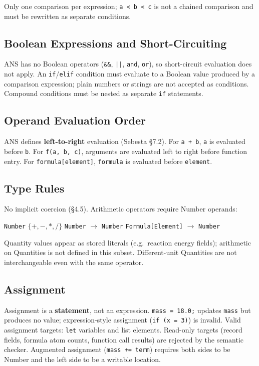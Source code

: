\documentclass[11pt,a4paper]{article}
\newcommand{\code}[1]{\texttt{#1}}
\begin{document}
Only one comparison per expression; \code{a < b < c} is not a chained comparison and must be rewritten as separate conditions.

\subsection{Boolean Expressions and Short-Circuiting}
ANS has no Boolean operators (\code{\&\&}, \code{||}, \code{and}, \code{or}), so short-circuit evaluation does not apply. An \code{if}/\code{elif} condition must evaluate to a Boolean value produced by a comparison expression; plain numbers or strings are not accepted as conditions. Compound conditions must be nested as separate \code{if} statements.

\subsection{Operand Evaluation Order}
ANS defines \textbf{left-to-right} evaluation (Sebesta \S7.2). For \code{a + b}, \code{a} is evaluated before \code{b}. For \code{f(a, b, c)}, arguments are evaluated left to right before function entry. For \code{formula[element]}, \code{formula} is evaluated before \code{element}.

\subsection{Type Rules}
No implicit coercion (\S4.5). Arithmetic operators require Number operands:
\begin{center}
\code{Number} $\{+, -, *, /\}$ \code{Number} $\to$ \code{Number} \qquad
\code{Formula[Element]} $\to$ \code{Number}
\end{center}
Quantity values appear as stored literals (e.g.\ reaction energy fields); arithmetic on Quantities is not defined in this subset. Different-unit Quantities are not interchangeable even with the same operator.

\subsection{Assignment}
Assignment is a \textbf{statement}, not an expression. \code{mass = 18.0;} updates \code{mass} but produces no value; expression-style assignment (\code{if (x = 3)}) is invalid. Valid assignment targets: \code{let} variables and list elements. Read-only targets (record fields, formula atom counts, function call results) are rejected by the semantic checker. Augmented assignment (\code{mass += term}) requires both sides to be Number and the left side to be a writable location.
\end{document}
